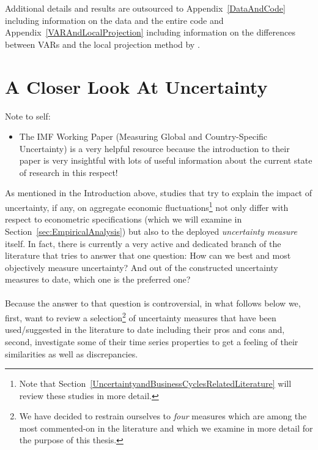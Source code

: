 \documentclass[a4paper,12pt,oneside,pointednumbers,bibtotoc,bigheadings,liststotoc]{scrbook}
\begin{document}
Additional details and results are outsourced to Appendix~\ref{DataAndCode} including information on the data and the entire code and Appendix~\ref{VARAndLocalProjection} including information on the differences between VARs and the local projection method by \citet{jorda:05}.








\chapter{A Closer Look At Uncertainty}
\label{MeasuringUncertaintyandaHistoricalView}

\begingroup
    \fontsize{8pt}{12pt}\selectfont
    Note to self:
\begin{itemize}
	\item  The IMF Working Paper (Measuring Global and Country-Specific Uncertainty) is a very helpful resource because the introduction to their paper is very insightful with lots of useful information about the current state of research in this respect!
\end{itemize}
\endgroup


As mentioned in the Introduction above, studies that try to explain the impact of uncertainty, if any, on aggregate economic fluctuations\footnote{Note that Section~\ref{UncertaintyandBusinessCyclesRelatedLiterature} will review these studies in more detail.} not only differ with respect to econometric specifications (which we will examine in Section~\ref{sec:EmpiricalAnalysis}) but also to the deployed \textit{uncertainty measure} itself. In fact, there is currently a very active and dedicated branch of the literature that tries to answer that one question: How can we best and most objectively measure uncertainty? And out of the constructed uncertainty measures to date, which one is the preferred one?\\
\\
Because the answer to that question is controversial, in what follows below we, first, want to review a selection\footnote{We have decided to restrain ourselves to \textit{four} measures which are among the most commented-on in the literature and which we examine in more detail for the purpose of this thesis.} of uncertainty measures that have been used/suggested in the literature to date including their pros and cons and, second, investigate some of their time series properties to get a feeling of their similarities as well as discrepancies.
\end{document}
